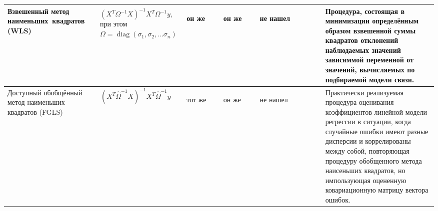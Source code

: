 \documentclass[10pt,a4paper]{article}
\DeclareMathOperator{\diag}{diag}  %
\begin{document}
\begin{table}[H]
{\begin{tabular}{|m{0.15\linewidth}|m{0.17\linewidth}|m{0.1\linewidth}|m{0.1\linewidth}|m{0.18\linewidth}|m{0.3\linewidth}|}
Взвешенный метод \newline наименьших~квадратов (WLS) & 
\begin{eqnarray*} & (X^T \Omega^{-1} X)^{-1}  X^T \Omega^{-1} y,\\
& \textit{при этом } \\
& \Omega = \diag(\sigma_1,\sigma_2, \ldots \sigma_n) \end{eqnarray*}  &  \begin{center} он же \end{center}& \begin{center}он же \end{center}&\begin{center} не нашел \end{center} & Процедура, состоящая в минимизации определённым образом взвешенной суммы квадратов отклонений наблюдаемых значений зависиммой переменной от значений, вычисляемых по подбираемой модели \newline связи. \\
\hline

Доступный обобщённый \newline метод наименьших \newline квадратов (FGLS) & \[(X^T \hat{\Omega}^{-1} X)^{-1}X^T \hat{\Omega}^{-1} y\] & \begin{center} тот же \end{center} & \begin{center} он же \end{center} & \begin{center} не нашел \end{center} & Практически реализуемая процедура оценивания коэффициентов линейной модели регрессии в ситуации, когда случайные ошибки имеют разные дисперсии и коррелированы между собой, повторяющая процедуру обобщенного метода наисеньших квадратов, но импользующая оцененную ковариационную \newline матрицу вектора ошибок. \\
\hline


\end{tabular}}
\end{table}
\end{document}
